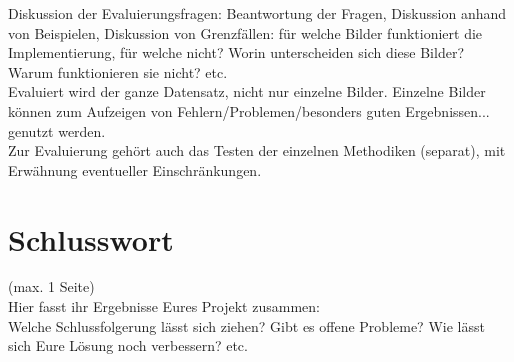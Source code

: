 \documentclass[paper=A4, deutsch]{scrartcl}
\begin{document}
Diskussion der Evaluierungsfragen: Beantwortung der Fragen, Diskussion anhand von Beispielen, Diskussion von Grenzfällen: für welche Bilder funktioniert die Implementierung, für welche nicht? Worin unterscheiden sich diese Bilder? Warum funktionieren sie nicht? etc.\\
Evaluiert wird der ganze Datensatz, nicht nur einzelne Bilder. Einzelne Bilder können zum Aufzeigen von Fehlern/Problemen/besonders guten Ergebnissen... genutzt werden.\\
Zur Evaluierung gehört auch das Testen der einzelnen Methodiken (separat), mit Erwähnung eventueller Einschränkungen.

\section{Schlusswort}
(max. 1 Seite)\\
Hier fasst ihr Ergebnisse Eures Projekt zusammen:\\
Welche Schlussfolgerung lässt sich ziehen? Gibt es offene Probleme? Wie lässt sich Eure Lösung noch verbessern? etc.



\end{document}
